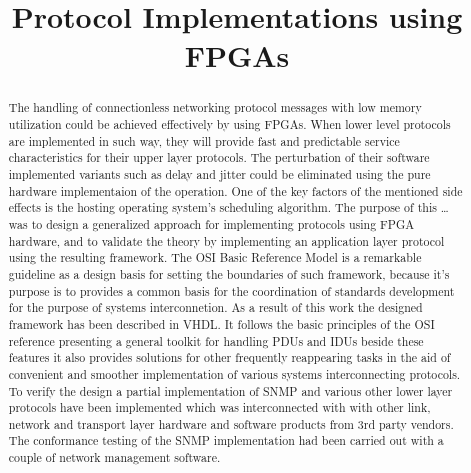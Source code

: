 \documentclass[conference]{IEEEtran}
\begin{document}
\title{Protocol Implementations using FPGAs}
\author{
}


\maketitle


\begin{abstract}
\boldmath
The handling of connectionless networking protocol messages with low memory utilization could be achieved effectively by using FPGAs. When lower level protocols are implemented in such way, they will provide fast and predictable service characteristics for their upper layer protocols. The perturbation of their software implemented variants such as delay and jitter could be eliminated using the pure hardware implementaion of the operation. One of the key factors of the mentioned side effects is the hosting operating system’s scheduling algorithm.
The purpose of this \dots was to design a generalized approach for implementing protocols using FPGA hardware, and to validate the theory by implementing an application layer protocol using the resulting framework.
The OSI Basic Reference Model is a remarkable guideline as a design basis for setting the boundaries of such framework, because it’s purpose is to provides a common basis for the coordination of standards development for the purpose of systems interconnetion.
As a result of this work the designed framework has been described in VHDL. It follows the basic principles of the OSI reference presenting a general toolkit for handling  PDUs and IDUs beside these features it also provides solutions for other frequently reappearing tasks in the aid of convenient and smoother implementation of various systems interconnecting protocols.
To verify the design a partial implementation of SNMP and various other lower layer protocols have been implemented which was interconnected with with other link, network and transport layer hardware and software products from 3rd party vendors. The conformance testing of the SNMP implementation had been carried out with a couple of network management software.

\end{abstract}
\end{document}
